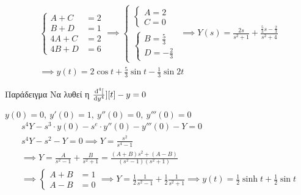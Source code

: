 \documentclass[11pt,a4paper,titlepage,final]{article}
\begin{document}
\begin{align*}
\begin{cases}
A + C &= 2 \\
B + D &= 1 \\
4A + C &= 2 \\
4B + D &= 6
\end{cases} \implies
\begin{cases}
\begin{cases}
A = 2 \\ C = 0
\end{cases} \\
\begin{cases}
B = \frac{5}{3} \\
D = -\frac{2}{3}
\end{cases}
\end{cases} \implies Y(s) = \frac{2s}{s^2+1} + \frac{\frac{5}{3}s-\frac{2}{3}}{s^2+4} \\
\implies \boxed{
	y(t) = 2\cos t + \frac{5}{3}\sin t - \frac{1}{3}\sin 2t
	}
\end{align*}

\begin{exercise*}{Παράδειγμα}
Να λυθεί η \( \od[4][y][t] -y = 0 \)

\( y(0)=0,\ y'(0)=1,\ y''(0)=0,\ y'''(0)=0 \)
\tcblower
\begin{align*}
s^4Y-s^3\cdot y(0)-s^e\cdot y''(0)-y'''(0)-Y = 0 \\
s^4Y -s^2-Y = 0 \implies Y = \frac{s^2}{s^4-1} \\
\implies Y = \frac{A}{s^2-1} + \frac{B}{s^2+1} = \frac{(A+B)s^2+(A-B)}{(s^2-1)(s^2+1)} \\
\implies \begin{cases}
A+B &= 1 \\ A-B &= 0
\end{cases}
\implies Y = \frac{1}{2}\frac{1}{s^2-1}+\frac{1}{2}\frac{1}{s^2+1} \implies y(t) = \frac{1}{2}\sinh t+ \frac{1}{2} \sin t
\end{align*}
\end{exercise*}
\end{document}
